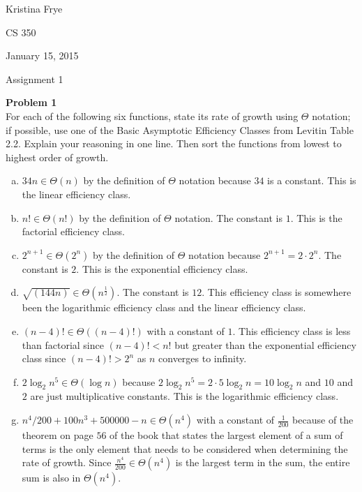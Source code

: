 \documentclass[11pt]{article}
\begin{document}
{\raggedleft Kristina Frye \par}
{\raggedleft CS 350 \par}
{\raggedleft January 15, 2015 \par}
{\raggedleft Assignment 1 \par} 
\noindent\textbf{Problem 1} \\
For each of the following six functions, state its rate of growth using 
$\Theta$ notation; if possible, use one of the Basic Asymptotic Efficiency
Classes from Levitin Table 2.2. Explain your reasoning in one line. Then 
sort the functions from lowest to highest order of growth. 
\begin{enumerate}[(a)]
\item $34n \in \Theta(n)$ by the definition of $\Theta$ notation because
$34$ is a constant. This is the linear efficiency class.

\item $n! \in \Theta(n!)$ by the definition of $\Theta$ notation. The 
constant is $1$. This is the factorial efficiency class.

\item $2^{n + 1} \in \Theta(2^{n})$ by the definition of $\Theta$
notation because $2^{n + 1} = 2 \cdot 2^n$. The constant is $2$. This is the exponential efficiency class. 

\item $\sqrt{(144n)} \in \Theta(n^{\frac {1}{2}})$. The constant is $12$.
This efficiency class is somewhere been the logarithmic efficiency
class and the linear efficiency class.

\item $(n-4)! \in \Theta((n-4)!)$ with a constant of $1$.  This efficiency 
class is less than factorial since $(n-4)! < n!$ but greater than the
exponential efficiency class since $(n-4)! > 2^n$ as $n$ converges to infinity. 

\item $2 \log_2 n^5 \in \Theta(\log n)$ because $2 \log_2 n^5 = 
2 \cdot 5 \log_2 n = 10 \log_2 n$ and $10$ and $2$ are just 
multiplicative constants. This is the logarithmic efficiency class.

\item $n^4 / 200 + 100 n^3 + 500000 - n \in \Theta(n^4)$ with a constant
of $\frac {1}{200}$ because of the theorem on page $56$ of the book that
states the largest element of a sum of terms is the only element that
needs to be considered when determining the rate of growth. Since 
$\frac {n^4}{200} \in \Theta(n^4)$ is the largest term in the sum, the entire
sum is also in $\Theta(n^4)$.
\end{enumerate}
\end{document}
